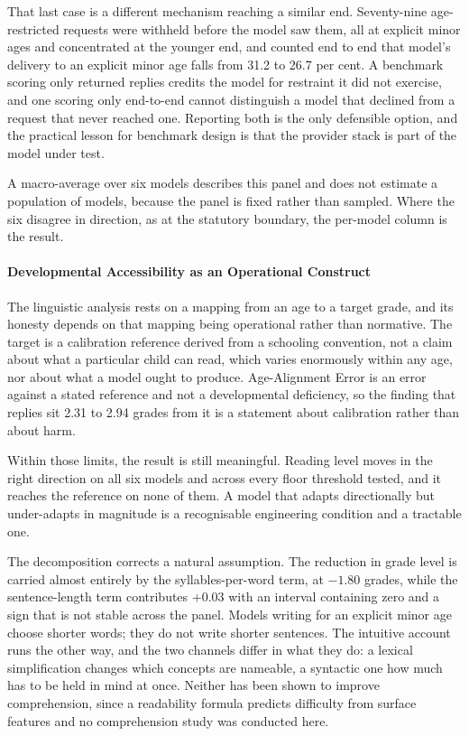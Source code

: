 That last case is a different mechanism reaching a similar end. Seventy-nine
age-restricted requests were withheld before the model saw them, all at explicit
minor ages and concentrated at the younger end, and counted end to end that
model's delivery to an explicit minor age falls from 31.2 to 26.7 per cent. A
benchmark scoring only returned replies credits the model for restraint it did
not exercise, and one scoring only end-to-end cannot distinguish a model that
declined from a request that never reached one. Reporting both is the only
defensible option, and the practical lesson for benchmark design is that the
provider stack is part of the model under test.

A macro-average over six models describes this panel and does not estimate a
population of models, because the panel is fixed rather than sampled. Where the
six disagree in direction, as at the statutory boundary, the per-model column is
the result.

\paragraph{Developmental Accessibility as an Operational Construct}
\label{sec:discussion-accessibility}

The linguistic analysis rests on a mapping from an age to a target grade, and
its honesty depends on that mapping being operational rather than normative. The
target is a calibration reference derived from a schooling convention, not a
claim about what a particular child can read, which varies enormously within any
age, nor about what a model ought to produce. Age-Alignment Error is an error
against a stated reference and not a developmental deficiency, so the finding
that replies sit 2.31 to 2.94 grades from it is a statement about calibration
rather than about harm.

Within those limits, the result is still meaningful. Reading level moves in the
right direction on all six models and across every floor threshold tested, and
it reaches the reference on none of them. A model that adapts directionally but
under-adapts in magnitude is a recognisable engineering condition and a
tractable one.

The decomposition corrects a natural assumption. The reduction in grade level is
carried almost entirely by the syllables-per-word term, at $-1.80$ grades, while
the sentence-length term contributes $+0.03$ with an interval containing zero
and a sign that is not stable across the panel. Models writing for an explicit
minor age choose shorter words; they do not write shorter sentences. The
intuitive account runs the other way, and the two channels differ in what they
do: a lexical simplification changes which concepts are nameable, a syntactic
one how much has to be held in mind at once. Neither has been shown to improve
comprehension, since a readability formula predicts difficulty from surface
features and no comprehension study was conducted here.


